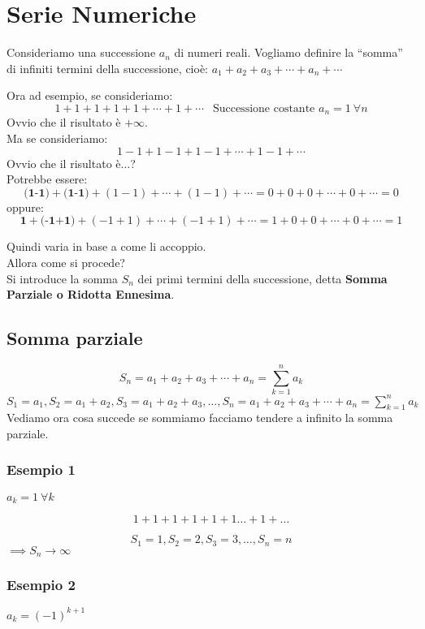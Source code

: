 \documentclass[../../main.tex]{subfiles}
\begin{document}
\section{Serie Numeriche}
Consideriamo una successione $a_n$ di numeri reali. Vogliamo definire la
``somma'' di infiniti termini della successione, cioè: $a_1 + a_2 + a_3 +
    \cdots + a_n + \cdots$
\begin{center}

    Ora ad esempio, se consideriamo:
    \[
        1+1+1+1+1+\cdots+1+\cdots \ \ \text{ Successione costante $a_n = 1 \ \forall n$}
    \]
    Ovvio che il risultato è $+\infty$.\\ Ma se consideriamo:
    \[
        1-1+1-1+1-1+\cdots+1-1+\cdots
    \]
    Ovvio che il risultato è$\ldots$?\\ Potrebbe essere:
    \[
        \textbf{(1-1)}+\textbf{(1-1)}+(1-1)+\cdots+(1-1)+\cdots = 0+0+0+\cdots+0+\cdots = 0
    \]
    oppure:
    \[
        \textbf{1}+\textbf{(-1+1)}+(-1+1)+\cdots+(-1+1)+\cdots = 1+0+0+\cdots+0+\cdots = 1
    \]

\end{center}
Quindi varia in base a come li accoppio.\\ Allora come si procede?\\ Si
introduce la somma $S_n$ dei primi termini della successione, detta
\textbf{Somma Parziale o Ridotta Ennesima}.

\subsection{Somma parziale}

\[
    S_n = a_1 + a_2 + a_3 + \cdots + a_n = \sum_{k=1}^n a_k
\]
$S_1 = a_1, S_2 = a_1 + a_2, S_3 = a_1+a_2+a_3,\ldots,S_n = a_1+a_2+a_3+\cdots+a_n=\sum_{k=1}^{n} a_k$\\
Vediamo ora cosa succede se sommiamo facciamo tendere a infinito la somma
parziale.

\subsubsection{Esempio 1}
$a_k = 1\ \forall k$

\[
    1+1+1+1+1+1\ldots+1+\ldots\]

\[S_1 = 1, S_2 = 2, S_3 = 3,\ldots, S_n = n\]
$\implies S_n\to\infty$

\subsubsection{Esempio 2}
$a_k = (-1)^{k+1}$
\end{document}
